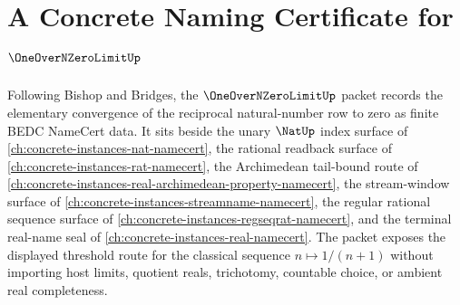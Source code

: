 \chapter{A Concrete Naming Certificate for $\OneOverNZeroLimitUp$}
\label{ch:concrete-instances-one-over-n-zero-limit-namecert}

Following Bishop and Bridges, the $\OneOverNZeroLimitUp$ packet records the elementary convergence of the reciprocal natural-number row to zero as finite BEDC NameCert data. It sits beside the unary $\NatUp$ index surface of \autoref{ch:concrete-instances-nat-namecert}, the rational readback surface of \autoref{ch:concrete-instances-rat-namecert}, the Archimedean tail-bound route of \autoref{ch:concrete-instances-real-archimedean-property-namecert}, the stream-window surface of \autoref{ch:concrete-instances-streamname-namecert}, the regular rational sequence surface of \autoref{ch:concrete-instances-regseqrat-namecert}, and the terminal real-name seal of \autoref{ch:concrete-instances-real-namecert}. The packet exposes the displayed threshold route for the classical sequence $n \mapsto 1/(n+1)$ without importing host limits, quotient reals, trichotomy, countable choice, or ambient real completeness.

